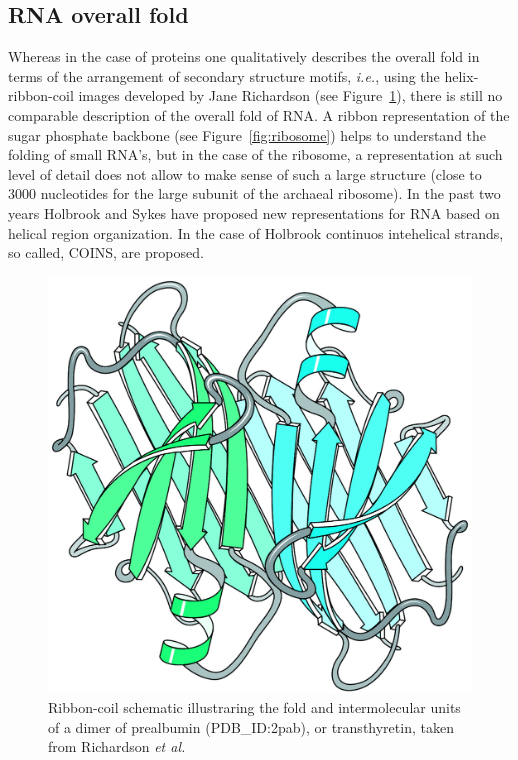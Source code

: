 \subsection{RNA  overall fold}  
Whereas  in  the case  of  proteins  one  qualitatively describes  the
overall  fold  in terms  of  the  arrangement  of secondary  structure
motifs, \textit{i.e.}, using the helix-ribbon-coil images developed by
Jane           Richardson          \cite{richardson2000}          (see
Figure~\ref{fig:ribboncoil}), there is still no comparable description
of  the overall  fold of  RNA. A  ribbon representation  of  the sugar
phosphate backbone (see Figure~\ref{fig:ribosome}) helps to understand
the  folding of  small  RNA's, but  in  the case  of  the ribosome,  a
representation at such level of detail does not allow to make sense of
such  a large  structure  (close  to 3000  nucleotides  for the  large
subunit of  the archaeal  ribosome).  In the  past two  years Holbrook
\cite{holbrook2008}  and  Sykes  \cite{sykes2009}  have  proposed  new
representations for  RNA based on helical region  organization. In the
case of Holbrook continuos  intehelical strands, so called, COINS, are
proposed.


\begin{figure}[ht]
\centering
\includegraphics[scale=0.4]{Chapter1/overallfold.png}
\caption{Ribbon-coil    schematic    illustraring    the   fold    and
  intermolecular  units of  a dimer  of prealbumin  (PDB\_ID:2pab), or
  transthyretin,    taken     from    Richardson    \textit{et    al.}
  \cite{richardson2002}}
\label{fig:ribboncoil}
\end{figure}

